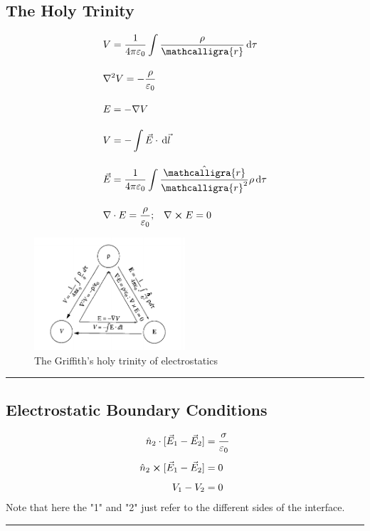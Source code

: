\documentclass[a4paper]{article}
\newcommand{\dmr}[1]{\, \mathrm{d}#1} %
\numberwithin{equation}{subsection}
\newcommand{\curly}[1]{\ensuremath{\mathcalligra{#1}}}
\begin{document}
\subsection{The Holy Trinity}
\begin{align}
    &V = \frac{1}{4\pi\varepsilon_0}\int\frac{\rho}{\curly{r}}\dmr{\tau}\\[1em]
    &\laplacian V = -\frac{\rho}{\varepsilon_0}\\[1em]
    &E = - \nabla V\\[1em]
    &V = -\int \vec{E}\cdot \dmr{\vec{l}}\\[1em]
    &\vec{E} = \frac{1}{4\pi\varepsilon_0}\int \frac{\hat{\curly{r}}}{\curly{r}^2}\rho\dmr{\tau}\\[1em]
    &\nabla \cdot E = \frac{\rho}{\varepsilon_0}; \;\;\; \nabla \cross E = 0
\end{align}
\begin{figure}[h]
    \centering
    \includegraphics[width =0.5\textwidth]{holytrinity.png}
    \caption{The Griffith's holy trinity of electrostatics\cite{Griffiths:611579}}
\end{figure}

\par\noindent\rule{\textwidth}{0.4pt}
\subsection{Electrostatic Boundary Conditions}
\begin{align}
    \hat{n}_2 \cdot [\vec{E}_1-\vec{E}_2] &= \frac{\sigma}{\varepsilon_0}\\[0.5em]
    \hat{n}_2 \cross [\vec{E}_1-\vec{E}_2] &= 0\\[0.5em]
    V_1 - V_2 &= 0
\end{align}
Note that here the "1" and "2" just refer to the different sides of the interface.

\par\noindent\rule{\textwidth}{0.4pt}
\end{document}
